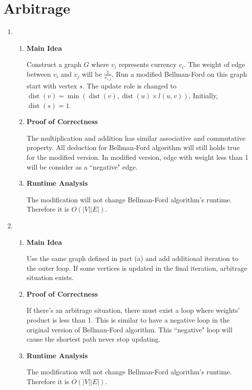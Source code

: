 \documentclass[11pt]{article}
\newenvironment{qparts}{\begin{enumerate}[{(}a{)}]}{\end{enumerate}}
\begin{document}
\section{Arbitrage}

\begin{qparts}
	\item
	
	\renewcommand{\theenumii}{\roman{enumii}}
	\begin{enumerate}
		\item \textbf{Main Idea}
		
		Construct a graph $G$ where $v_i$ represents currency $c_i$. The weight of edge between $v_i$ and $v_j$ will be $\frac{1}{r_{i,j}}$. Run a modified Bellman-Ford on this graph start with vertex $s$. The update role is changed to $\operatorname{dist}(v) = \operatorname{min}(\operatorname{dist}(v), \operatorname{dist}(u) \times l(u, v))$. Initially, $\operatorname{dist}(s) = 1$.
		
		\item \textbf{Proof of Correctness}
		
		The multiplication and addition has similar associative and commutative property. All deduction for Bellman-Ford algorithm will still holds true for the modified version. In modified version, edge with weight less than 1 will be consider as a ``negative" edge.
		
		\item \textbf{Runtime Analysis}
		
		The modification will not change Bellman-Ford algorithm's runtime. Therefore it is $O(|V||E|)$.
		
	\end{enumerate}
	
	\item
	
		\renewcommand{\theenumii}{\roman{enumii}}
	\begin{enumerate}
		\item \textbf{Main Idea}
		
		Use the same graph defined in part (a) and add additional iteration to the outer loop. If some vertices is updated in the final iteration, arbitrage situation exists.
		
		\item \textbf{Proof of Correctness}
		
		If there's an arbitrage situation, there must exist a loop where weights' product is less than 1. This is similar to have a negative loop in the original version of Bellman-Ford algorithm. This ``negative" loop will cause the shortest path never stop updating.
		
		\item \textbf{Runtime Analysis}
		
		The modification will not change Bellman-Ford algorithm's runtime. Therefore it is $O(|V||E|)$.
		
	\end{enumerate}

\end{qparts}
\newpage
\end{document}
